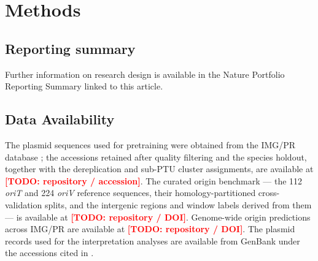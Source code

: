 \documentclass[11pt]{article}
\newif\ifmaintextpart\maintextparttrue
\theoremstyle{plain}
\def\todo#1{\textbf{\textcolor{red}{ [TODO: #1]}}}
\begin{document}
\section*{Methods}
\label{sec:methods}





\subsection*{Reporting summary}
Further information on research design is available in the Nature Portfolio Reporting Summary linked to this article.

\subsection*{Data Availability}
The plasmid sequences used for pretraining were obtained from the IMG/PR
database \cite{camargo2024img}; the accessions retained after quality
filtering and the species holdout, together with the dereplication and sub-PTU
cluster assignments, are available at \todo{repository / accession}. The
curated origin benchmark --- the 112 \emph{oriT} and 224 \emph{oriV}
reference sequences, their homology-partitioned cross-validation splits, and
the intergenic regions and window labels derived from them --- is available at
\todo{repository / DOI}. Genome-wide origin predictions across IMG/PR are
available at \todo{repository / DOI}. The plasmid records used for the
interpretation analyses are available from GenBank under the accessions cited
in .
\end{document}
